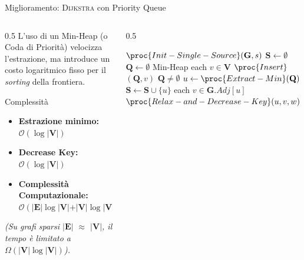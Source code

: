 \documentclass[aspectratio=169]{beamer}
\begin{document}
\begin{frame}[fragile]{Miglioramento: \textsc{Dijkstra} con Priority Queue}
    \begin{columns}
        \begin{column}{0.5\textwidth}
            L'uso di un Min-Heap (o Coda di Priorità) velocizza l'estrazione, ma introduce un costo logaritmico fisso per il \textit{sorting} della frontiera.
            \vspace{0.2cm}
            \begin{block}{Complessità}
                \begin{itemize}
                    \item \textbf{Estrazione minimo:} $\mathcal{O}(\log \vert \mathbf{V}\vert)$
                    \item \textbf{Decrease Key:} $\mathcal{O}(\log \vert \mathbf{V}\vert)$ 
                    \item \textbf{Complessità Computazionale:} $\mathcal{O}(\vert \mathbf{E}\vert \log \vert \mathbf{V}\vert + \vert \mathbf{V}\vert \log \vert \mathbf{V}\vert)$ 
                \end{itemize}
            \end{block}
            \small \textit{(Su grafi sparsi $\vert \mathbf{E}\vert$ $\approx$ $\vert \mathbf{V}\vert$, il tempo è limitato a $\Omega(\vert \mathbf{V}\vert \log \vert \mathbf{V}\vert)$).}
        \end{column}
        \begin{column}{0.5\textwidth}
            \scriptsize
            \begin{codebox}
            \li $\proc{Init-Single-Source}(\mathbf{G}, s)$
            \li $\mathbf{S} \gets \emptyset$
            \li $\mathbf{Q} \gets \emptyset$ \Comment Min-Heap
            \li \For each $v \in \mathbf{V}$ 
            \li \Do $\proc{Insert}$ $(\mathbf{Q}, v)$ \End
            \li \While $\mathbf{Q} \neq \emptyset$
            \li   \Do $u \gets \proc{Extract-Min}(\mathbf{Q})$
            \li       $\mathbf{S} \gets \mathbf{S} \cup \{u\}$
            \li       \For each $v \in \mathbf{G}.Adj[u]$
            \li           \Do $\proc{Relax-and-Decrease-Key}(u, v, w)$
                    \End
                \End
            \end{codebox}
        \end{column}
    \end{columns}
\end{frame}
\end{document}
